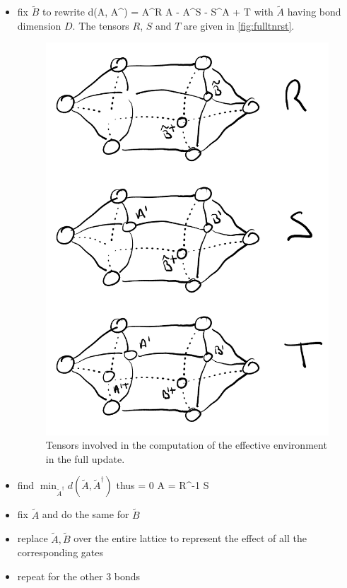         \begin{itemize}
            \item fix $\tilde B$ to rewrite
            \be d(\tilde A, \tilde A^\dagger) = \tilde A^\dagger R \tilde A - \tilde A^\dagger S - S^\dagger \tilde A + T \ee
            with $ \tilde A$ having bond dimension $D$. The tensors $R$, $S$ and $T$ are given in \autoref{fig:fulltnrst}.

            \begin{figure}[h!]
                \centering
                \includegraphics[scale=0.25]{graphs/fulltnrst.png}
                \caption{Tensors involved in the computation of the effective environment in the full update.}
                \label{fig:fulltnrst}
            \end{figure}

            \item find $\min_{\tilde A^\dagger} d(\tilde A,\tilde A^\dagger)$ thus 
            \be {} = 0 \implies \tilde A = R^{-1} S \ee
            \item fix $\tilde A$ and do the same for $\tilde B$
            \item replace $\tilde A,\tilde B$ over the entire lattice to represent the effect of all the corresponding gates
            \item repeat for the other $3$ bonds
        \end{itemize}

